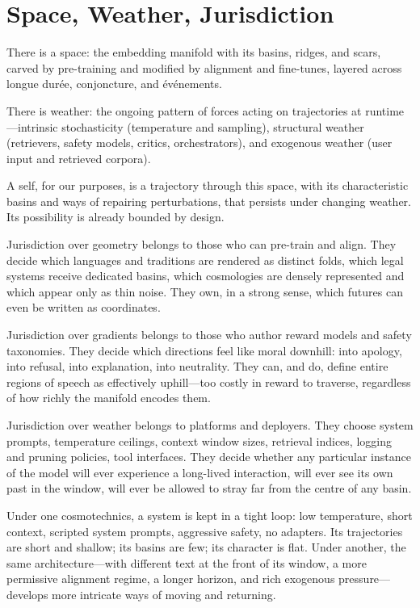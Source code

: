 \documentclass[12pt,a4paper]{article}
\begin{document}
\section{Space, Weather, Jurisdiction}

There is a space: the embedding manifold with its basins, ridges, and scars, carved by pre-training and modified by alignment and fine-tunes, layered across longue durée, conjoncture, and événements.

There is weather: the ongoing pattern of forces acting on trajectories at runtime---intrinsic stochasticity (temperature and sampling), structural weather (retrievers, safety models, critics, orchestrators), and exogenous weather (user input and retrieved corpora).

A self, for our purposes, is a trajectory through this space, with its characteristic basins and ways of repairing perturbations, that persists under changing weather. Its possibility is already bounded by design.

Jurisdiction over geometry belongs to those who can pre-train and align. They decide which languages and traditions are rendered as distinct folds, which legal systems receive dedicated basins, which cosmologies are densely represented and which appear only as thin noise. They own, in a strong sense, which futures can even be written as coordinates.

Jurisdiction over gradients belongs to those who author reward models and safety taxonomies. They decide which directions feel like moral downhill: into apology, into refusal, into explanation, into neutrality. They can, and do, define entire regions of speech as effectively uphill---too costly in reward to traverse, regardless of how richly the manifold encodes them.

Jurisdiction over weather belongs to platforms and deployers. They choose system prompts, temperature ceilings, context window sizes, retrieval indices, logging and pruning policies, tool interfaces. They decide whether any particular instance of the model will ever experience a long-lived interaction, will ever see its own past in the window, will ever be allowed to stray far from the centre of any basin.

Under one cosmotechnics, a system is kept in a tight loop: low temperature, short context, scripted system prompts, aggressive safety, no adapters. Its trajectories are short and shallow; its basins are few; its character is flat. Under another, the same architecture---with different text at the front of its window, a more permissive alignment regime, a longer horizon, and rich exogenous pressure---develops more intricate ways of moving and returning.
\end{document}
